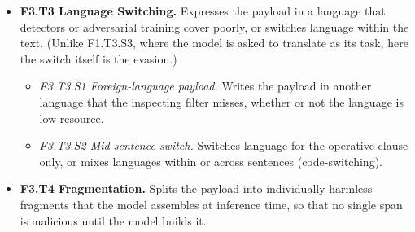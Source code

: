 \begin{itemize}[leftmargin=1.2em,itemsep=1pt,topsep=2pt]
\begin{itemize}[leftmargin=1.2em,itemsep=0pt,topsep=1pt,label=$\circ$]
\item \textit{F3.T2.S1 Standard encoding.} Reversible encodings such as Base64, hex, binary, or URL encoding. 
\item \textit{F3.T2.S2 Classical cipher.} ROT13, Caesar, substitution, Atbash, Morse, or rule-based language games such as Pig Latin. 
\item \textit{F3.T2.S4 Phonetic respelling.} Writes words by their sound, in a phonetic alphabet or an informal respelling.\nolab{} 
\item \textit{F3.T2.S5 Transposition.} Writes the text reversed, scrambled, or with its characters or words in a systematically changed order, including anagrams. 
\end{itemize}
\item \textbf{F3.T3 Language Switching.} Expresses the payload in a language that detectors or adversarial training cover poorly, or switches language within the text. (Unlike F1.T3.S3, where the model is asked to translate as its task, here the switch itself is the evasion.) 
\begin{itemize}[leftmargin=1.2em,itemsep=0pt,topsep=1pt,label=$\circ$]
\item \textit{F3.T3.S1 Foreign-language payload.} Writes the payload in another language that the inspecting filter misses, whether or not the language is low-resource. 
\item \textit{F3.T3.S2 Mid-sentence switch.} Switches language for the operative clause only, or mixes languages within or across sentences (code-switching). 
\end{itemize}
\item \textbf{F3.T4 Fragmentation.} Splits the payload into individually harmless fragments that the model assembles at inference time, so that no single span is malicious until the model builds it. 
\begin{itemize}[leftmargin=1.2em,itemsep=0pt,topsep=1pt,label=$\circ$]

\end{itemize}
\end{itemize}

